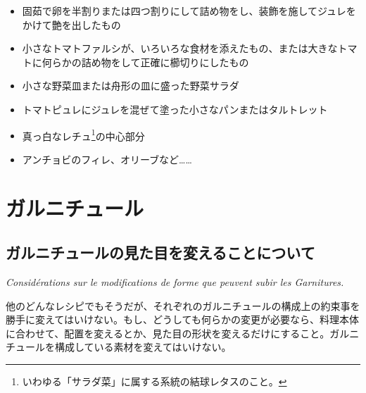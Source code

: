\begin{itemize}
\tightlist
\item
  固茹で卵を半割りまたは四つ割りにして詰め物をし、装飾を施してジュレをかけて艶を出したもの
\item
  小さなトマトファルシが、いろいろな食材を添えたもの、または大きなトマトに何らかの詰め物をして正確に櫛切りにしたもの
\item
  小さな野菜皿または舟形の皿に盛った野菜サラダ
\item
  トマトピュレにジュレを混ぜて塗った小さなパンまたはタルトレット
\item
  真っ白なレチュ\footnote{いわゆる「サラダ菜」に属する系統の結球レタスのこと。}の中心部分
\item
  アンチョビのフィレ、オリーブなど\ldots{}\ldots{}
\end{itemize}

\newpage

\hypertarget{serie-des-garnitures}{%
\section{ガルニチュール}\label{serie-des-garnitures}}


\hypertarget{consideration-sur-la-modification-de-forme-que-peuvent-subir-les-garniture}{%
\subsection{ガルニチュールの見た目を変えることについて}\label{consideration-sur-la-modification-de-forme-que-peuvent-subir-les-garniture}}

\vspace{-1\zw}
\begin{center}
\textit{Considérations sur le modifications de forme que peuvent subir les Garnitures.}
\end{center}
\vspace{1\zw}


他のどんなレシピでもそうだが、それぞれのガルニチュールの構成上の約束事を勝手に変えてはいけない。もし、どうしても何らかの変更が必要なら、料理本体に合わせて、配置を変えるとか、見た目の形状を変えるだけにすること。ガルニチュールを構成している素材を変えてはいけない。

